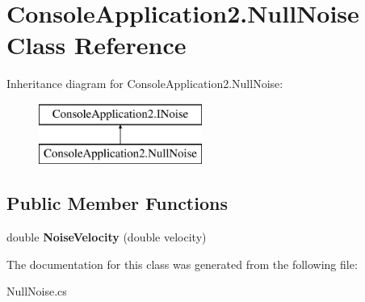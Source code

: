 \hypertarget{class_console_application2_1_1_null_noise}{}\section{Console\+Application2.\+Null\+Noise Class Reference}
\label{class_console_application2_1_1_null_noise}
Inheritance diagram for Console\+Application2.\+Null\+Noise\+:\begin{figure}[H]
\begin{center}
\leavevmode
\includegraphics[height=2.000000cm]{class_console_application2_1_1_null_noise}
\end{center}
\end{figure}
\subsection*{Public Member Functions}
\begin{DoxyCompactItemize}
\item 
\hypertarget{class_console_application2_1_1_null_noise_aad85ddd3001ac1aba2953b3e35f14a75}{}double {\bfseries Noise\+Velocity} (double velocity)\label{class_console_application2_1_1_null_noise_aad85ddd3001ac1aba2953b3e35f14a75}

\end{DoxyCompactItemize}


The documentation for this class was generated from the following file\+:\begin{DoxyCompactItemize}
\item 
Null\+Noise.\+cs\end{DoxyCompactItemize}
